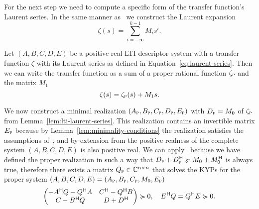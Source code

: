 For the next step we need to compute a specific form of the transfer function's Laurent series.
In the same manner as~\cite[Equation~(37)]{CGH2022} we construct the Laurent expansion
\begin{equation}\label{eq:laurent-series}
    \zeta(s) = \sum\limits_{i = -\infty}^{k - 1} M_i s^i.
\end{equation}


\begin{lemma}\label{lem:lti-laurent-series}
    Let $(A, B, C, D, E)$ be a positive real \ac{LTI} descriptor system with a transfer function $\zeta$ with its Laurent series as defined in Equation~\eqref{eq:laurent-series}.
    Then we can write the transfer function as a sum of a proper rational function $\zeta_{\textnormal{\scshape p}}$ and the matrix $M_1$
    \begin{equation}\label{eq:pr-lti-laurent-series}
        \zeta(s) = \zeta_{\textnormal{\scshape p}}(s) + M_1 s.
    \end{equation}
\end{lemma}

We now construct a minimal realization $(A_{\textnormal{\scshape p}}, B_{\textnormal{\scshape p}}, C_{\textnormal{\scshape p}}, D_{\textnormal{\scshape p}}, E_{\textnormal{\scshape p}})$ with $D_{\textnormal{\scshape p}} = M_0$ of $\zeta_{\textnormal{\scshape p}}$ from Lemma~\ref{lem:lti-laurent-series}.
This realization contains an invertible matrix $E_{\textnormal{\scshape p}}$ because by Lemma~\ref{lem:minimality-conditions} the realization satisfies the assumptions of~\cite[Theorem~6.3]{Freund2004}, and by extension from the positive realness of the complete system $(A, B, C, D, E)$ is also positive real.
We can apply~\cite[Proposition~5.4]{CGH2022} because we have defined the proper realization in such a way that $D_{\textnormal{\scshape p}} + D_{\textnormal{\scshape p}}^{\mkern1mu \mathsf{H}} \succcurlyeq M_0 + M_0^{\mkern1mu \mathsf{H}}$ is always true, therefore there exists a matrix $Q_{\textnormal{\scshape p}} \in \mathbb{C}^{n \times n}$ that solves the \acp{KYP} for the proper system $(A, B, C, D, E) = (A_{\textnormal{\scshape p}}, B_{\textnormal{\scshape p}}, C_{\textnormal{\scshape p}}, M_0, E_{\textnormal{\scshape p}})$
\begin{equation}\label{eq:kyp-lmi}
    \begin{pmatrix}
        -A^{\mkern1mu \mathsf{H}} Q - Q^{\mkern1mu \mathsf{H}} A & C^{\mkern1mu \mathsf{H}} - Q^{\mkern1mu \mathsf{H}} B \\
        C - B^{\mkern1mu \mathsf{H}} Q & D + D^{\mkern1mu \mathsf{H}}
    \end{pmatrix} \succcurlyeq 0,\quad E^{\mkern1mu \mathsf{H}} Q = Q^{\mkern1mu \mathsf{H}} E \succcurlyeq 0.
\end{equation}

